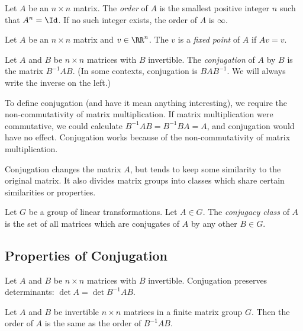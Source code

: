 \documentclass[fleqn]{report}
\begin{document}
\begin{defn}
Let $A$ be an $n \times n$ matrix. The \emph{order} of $A$ is the
smallest positive integer $n$ such that $A^n = \Id$. If no
such integer exists, the order of $A$ is $\infty$.
\end{defn}

\begin{defn}
Let $A$ be an $n \times n$ matrix and $v \in \RR^n$. The $v$
is a \emph{fixed point} of $A$ if $Av = v$.
\end{defn}

\begin{defn}
Let $A$ and $B$ be $n \times n$ matrices with $B$ invertible.
The \emph{conjugation} of $A$ by $B$ is the matrix $B^{-1}AB$. 
(In some contexts, conjugation is $BAB^{-1}$. We
will always write the inverse on the left.)
\end{defn}

To define conjugation (and have it mean anything interesting),
we require the non-commutativity of matrix multiplication. If
matrix multiplication were commutative, we could calculate
$B^{-1}AB = B^{-1}BA = A$, and conjugation would have no
effect. Conjugation works because of the non-commutativity of
matrix multiplication.

Conjugation changes the matrix $A$, but tends to keep some
similarity to the original matrix. It also divides matrix
groups into classes which share certain similarities or
properties.

\begin{defn}
Let $G$ be a group of linear transformations. Let $A \in G$.
The \emph{conjugacy class} of $A$ is the set of all matrices
which are conjugates of $A$ by any other $B \in G$.
\end{defn}

\subsection{Properties of Conjugation}
\label{conjugation-properties}

\begin{prop}
Let $A$ and $B$ be $n \times n$ matrices with $B$ invertible.
Conjugation preserves determinants: $\det A = \det
B^{-1}AB$.
\end{prop}

\begin{prop}
Let $A$ and $B$ be invertible $n \times n$ matrices in a
finite matrix group $G$. Then the order of
$A$ is the same as the order of $B^{-1}AB$.
\end{prop}
\end{document}
